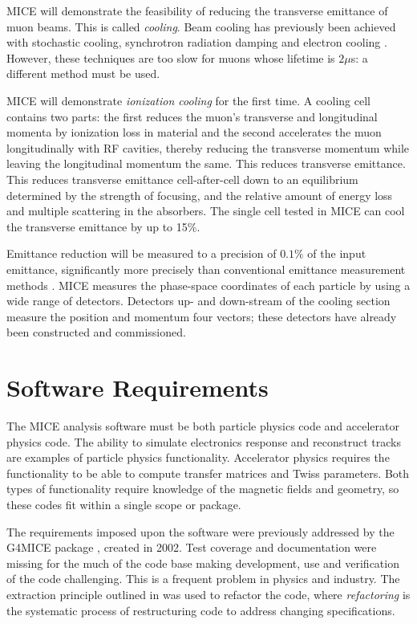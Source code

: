 \documentclass{JAC2003}
\begin{document}
MICE will demonstrate the feasibility of reducing the transverse emittance of muon beams. This is called \emph{cooling}.  Beam cooling has previously been achieved with stochastic cooling, synchrotron radiation damping and electron cooling \cite{cooling}.  However, these techniques are too slow for muons  whose lifetime is $2\mu$s: a different method must be used.

MICE will demonstrate \emph{ionization cooling} for the first time.  A cooling cell contains two parts: the first reduces the muon's transverse and longitudinal momenta by ionization loss in material and the second accelerates the muon longitudinally with RF cavities, thereby reducing the transverse momentum while leaving the longitudinal momentum the same. This reduces transverse emittance. This reduces transverse emittance cell-after-cell down to an equilibrium determined by the strength of focusing, and the relative amount of energy loss and multiple scattering in the absorbers. The single cell tested in MICE can cool the transverse emittance by up to 15\%.

Emittance reduction will be measured to a precision of  $0.1\%$ of the input emittance, significantly more precisely than conventional emittance measurement methods \cite{measurements}.  MICE measures the phase-space coordinates of each particle by using a wide range of detectors.  Detectors up- and down-stream of the cooling section measure the position and momentum four vectors; these detectors have already been constructed and commissioned.  

\section{Software Requirements}

The MICE analysis software must be both particle physics code and accelerator physics code.  The ability to simulate electronics response and reconstruct tracks are examples of particle physics functionality.  Accelerator physics requires the functionality to be able to compute transfer matrices and Twiss parameters. Both types of functionality require knowledge of the magnetic fields and geometry, so these codes fit within a single scope or package.

The requirements imposed upon the software were previously addressed by the G4MICE package \cite{g4mice}, created in 2002. Test coverage and documentation were missing for the much of the code base making development, use and verification of the code challenging. This is a frequent problem in physics and industry. The extraction principle outlined in \cite{refactoring} was used to refactor the code, where \emph{refactoring} is the systematic process of restructuring code to address changing specifications.
\end{document}
